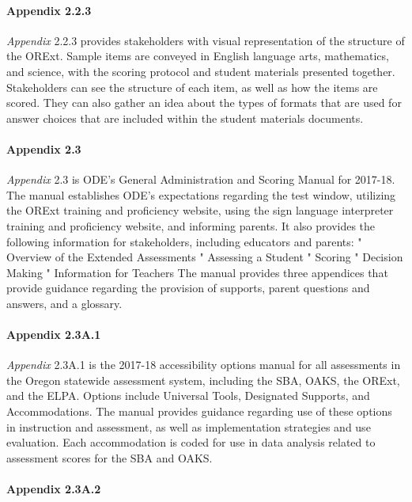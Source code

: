 \documentclass[]{article}
\let\oldparagraph\paragraph
\renewcommand{\paragraph}[1]{\oldparagraph{#1}\mbox{}}
\begin{document}
\paragraph{Appendix 2.2.3}\label{appendix-2.2.3}

\emph{Appendix} 2.2.3 provides stakeholders with visual representation
of the structure of the ORExt. Sample items are conveyed in English
language arts, mathematics, and science, with the scoring protocol and
student materials presented together. Stakeholders can see the structure
of each item, as well as how the items are scored. They can also gather
an idea about the types of formats that are used for answer choices that
are included within the student materials documents.

\paragraph{Appendix 2.3}\label{appendix-2.3}

\emph{Appendix} 2.3 is ODE's General Administration and Scoring Manual
for 2017-18. The manual establishes ODE's expectations regarding the
test window, utilizing the ORExt training and proficiency website, using
the sign language interpreter training and proficiency website, and
informing parents. It also provides the following information for
stakeholders, including educators and parents: " Overview of the
Extended Assessments " Assessing a Student " Scoring " Decision Making "
Information for Teachers The manual provides three appendices that
provide guidance regarding the provision of supports, parent questions
and answers, and a glossary.

\paragraph{Appendix 2.3A.1}\label{appendix-2.3a.1}

\emph{Appendix} 2.3A.1 is the 2017-18 accessibility options manual for
all assessments in the Oregon statewide assessment system, including the
SBA, OAKS, the ORExt, and the ELPA. Options include Universal Tools,
Designated Supports, and Accommodations. The manual provides guidance
regarding use of these options in instruction and assessment, as well as
implementation strategies and use evaluation. Each accommodation is
coded for use in data analysis related to assessment scores for the SBA
and OAKS.

\paragraph{Appendix 2.3A.2}\label{appendix-2.3a.2}
\end{document}
